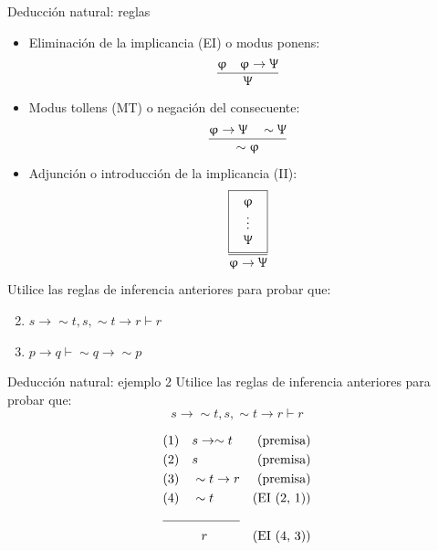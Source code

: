 \documentclass{beamer}
\begin{document}
\begin{frame}{Deducción natural: reglas}
  \begin{itemize}
    \item Eliminación de la implicancia (EI) o modus ponens:
    $$\dfrac{\upvarphi \quad \upvarphi \rightarrow \Uppsi}{\Uppsi}$$

    \item Modus tollens (MT) o negación del consecuente:
    $$\dfrac{\upvarphi \rightarrow \Uppsi \quad \sim \Uppsi}{\sim \upvarphi}$$

    \item Adjunción o introducción de la implicancia (II):
          \begin{equation*}
            \frac{
              \fbox{
                $\begin{array}{c}
                  \upvarphi \\
                  \vdots \\
                  \Uppsi
                \end{array}$
              }
            }{\upvarphi \rightarrow \Uppsi}
          \end{equation*}
  \end{itemize}

  Utilice las reglas de inferencia anteriores para probar que:
  \begin{enumerate}
    \setcounter{enumi}{1}
    \item $s \rightarrow \sim t, s, \sim t \rightarrow r \vdash r$
    \item $p \rightarrow q \vdash \sim q \rightarrow \sim p$
  \end{enumerate}
\end{frame}


\begin{frame}{Deducción natural: ejemplo 2}
  Utilice las reglas de inferencia anteriores para probar que:
  $$s \rightarrow \sim t, s, \sim t \rightarrow r \vdash r$$

  \begin{align*}
    &(1) \quad s \rightarrow \sim t &\text{(premisa)}\\
    &(2) \quad s &\text{(premisa)}\\
    &(3) \quad \sim t \rightarrow r &\text{(premisa)}\\
    &(4) \quad \sim t &\text{(EI (2, 1))}\\
    \cline{1-2}
    &\qquad \quad r &\text{(EI (4, 3))}
  \end{align*}
\end{frame}
\end{document}
